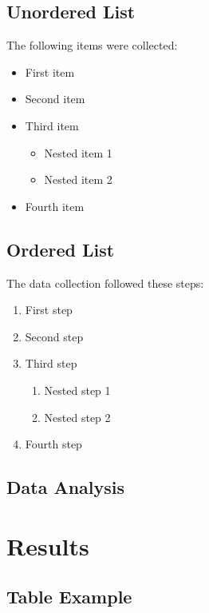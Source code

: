 \documentclass[lineno]{biometrika}
\begin{document}
\lipsum[4]

\subsection{Unordered List}

The following items were collected:

\begin{itemize}
	\item First item
	\item Second item
	\item Third item
	\begin{itemize}
		\item Nested item 1
		\item Nested item 2
	\end{itemize}
	\item Fourth item
\end{itemize}

\subsection{Ordered List}

The data collection followed these steps:

\begin{enumerate}
	\item First step
	\item Second step
	\item Third step
	\begin{enumerate}
		\item Nested step 1
		\item Nested step 2
	\end{enumerate}
	\item Fourth step
\end{enumerate}


\subsection{Data Analysis}



\lipsum[5]

\section{Results}


\lipsum[6]

\subsection{Table Example}
\end{document}
